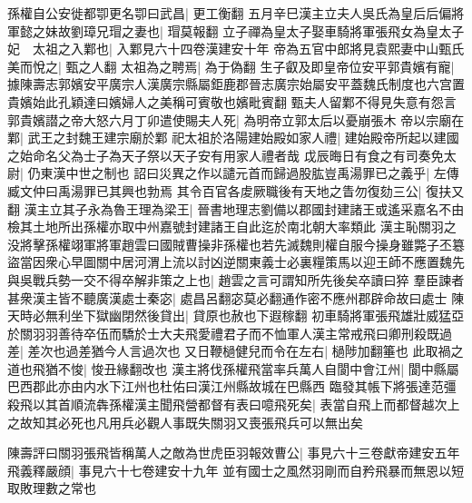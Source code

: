 孫權自公安徙都卾更名卾曰武昌|{
	更工衡翻}
五月辛巳漢主立夫人吳氏為皇后后偏將軍懿之妹故劉璋兄瑁之妻也|{
	瑁莫報翻}
立子禪為皇太子娶車騎將軍張飛女為皇太子妃　太祖之入鄴也|{
	入鄴見六十四卷漢建安十年}
帝為五官中郎將見袁熙妻中山甄氏美而悅之|{
	甄之人翻}
太祖為之聘焉|{
	為于偽翻}
生子叡及即皇帝位安平郭貴嬪有寵|{
	據陳壽志郭嬪安平廣宗人漢廣宗縣屬鉅鹿郡晉志廣宗始屬安平蓋魏氏制度也六宫置貴嬪始此孔穎達曰嬪婦人之美稱可賓敬也嬪毗賓翻}
甄夫人留鄴不得見失意有怨言郭貴嬪譛之帝大怒六月丁卯遣使賜夫人死|{
	為明帝立郭太后以憂崩張木}
帝以宗廟在鄴|{
	武王之封魏王建宗廟於鄴}
祀太祖於洛陽建始殿如家人禮|{
	建始殿帝所起以建國之始命名父為士子為天子祭以天子安有用家人禮者哉}
戉辰晦日有食之有司奏免太尉|{
	仍東漢中世之制也}
詔曰災異之作以譴元首而歸過股肱豈禹湯罪已之義乎|{
	左傳臧文仲曰禹湯罪已其興也勃焉}
其令百官各䖍厥職後有天地之眚勿復劾三公|{
	復扶又翻}
漢主立其子永為魯王理為梁王|{
	晉書地理志劉備以郡國封建諸王或遙采嘉名不由檢其土地所出孫權亦取中州嘉號封建諸王自此迄於南北朝大率類此}
漢主恥關羽之没將擊孫權翊軍將軍趙雲曰國賊曹操非孫權也若先滅魏則權自服今操身雖斃子丕簒盜當因衆心早圖關中居河渭上流以討凶逆關東義士必裏糧策馬以迎王師不應置魏先與吳戰兵勢一交不得卒解非策之上也|{
	趙雲之言可謂知所先後矣卒讀曰猝}
羣臣諫者甚衆漢主皆不聽廣漢處士秦宓|{
	處昌呂翻宓莫必翻通作密不應州郡辟命故曰處士}
陳天時必無利坐下獄幽閉然後貸出|{
	貸原也赦也下遐稼翻}
初車騎將軍張飛雄壯威猛亞於關羽羽善待卒伍而驕於士大夫飛愛禮君子而不恤軍人漢主常戒飛曰卿刑殺既過差|{
	差次也過差猶今人言過次也}
又日鞭檛健兒而令在左右|{
	檛陟加翻箠也}
此取禍之道也飛猶不悛|{
	悛丑緣翻改也}
漢主將伐孫權飛當率兵萬人自閬中會江州|{
	閬中縣屬巴西郡此亦由内水下江州也杜佑曰漢江州縣故城在巴縣西}
臨發其帳下將張達范彊殺飛以其首順流犇孫權漢主聞飛營都督有表曰噫飛死矣|{
	表當自飛上而都督越次上之故知其必死也凡用兵必觀人事既失關羽又喪張飛兵可以無出矣}


陳壽評曰關羽張飛皆稱萬人之敵為世虎臣羽報效曹公|{
	事見六十三卷獻帝建安五年}
飛義釋嚴顔|{
	事見六十七卷建安十九年}
並有國士之風然羽剛而自矜飛暴而無恩以短取敗理數之常也

